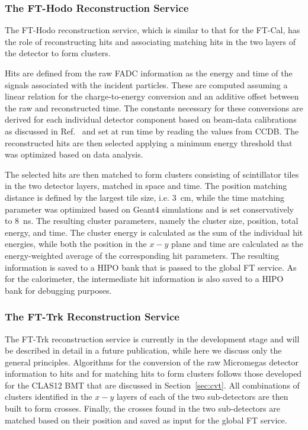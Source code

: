 \subsubsection{The FT-Hodo Reconstruction Service}

The FT-Hodo reconstruction service, which is similar to that for the FT-Cal, has the role of reconstructing hits
and associating matching hits in the two layers of the detector to form clusters. 

Hits are defined from the raw FADC information as the energy and time of the signals associated with the incident
particles. These are computed assuming a linear relation for the charge-to-energy conversion and an additive
offset between the raw and reconstructed time. The constants necessary for these conversions are derived
for each individual detector component based on beam-data calibrations as discussed in Ref.~\cite{ft-nim} and set
at run time by reading the values from CCDB. The reconstructed hits are then selected applying a minimum energy
threshold that was optimized based on data analysis.

The selected hits are then matched to form clusters consisting of scintillator tiles in the two detector layers,
matched in space and time. The position matching distance is defined by the largest tile size, i.e. 3~cm, while the
time matching parameter was optimized based on Geant4 simulations and is set conservatively to 8~ns. The
resulting cluster parameters, namely the cluster size, position, total energy, and time. The cluster energy is
calculated as the sum of the individual hit energies, while both the position in the $x-y$ plane and time are calculated
as the energy-weighted average of the corresponding hit parameters. The resulting information is saved to a HIPO
bank that is passed to the global FT service. As for the calorimeter, the intermediate hit information is also saved
to a HIPO bank for debugging purposes.

\subsubsection{The FT-Trk Reconstruction Service}

The FT-Trk reconstruction service is currently in the development stage and will be described in detail in a
future publication, while here we discuss only the general principles. Algorithms for the conversion of the raw
Micromegas detector information to hits and for matching hits to form clusters follows those developed for
the CLAS12 BMT that are discussed in Section~\ref{sec:cvt}. All combinations of clusters identified in the
$x-y$ layers of each of the two sub-detectors are then built to form crosses. Finally, the  crosses found in the
two sub-detectors are matched based on their position and saved as input for the global FT service.

